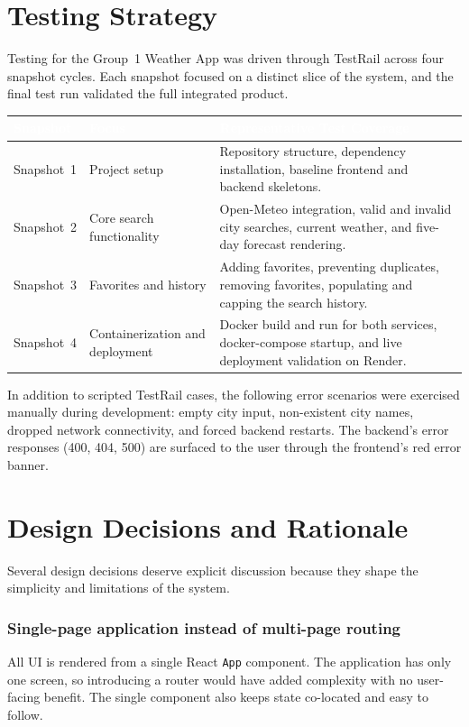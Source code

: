 \documentclass[11pt,letterpaper]{article}
\newcommand{\thead}[1]{\textcolor{white}{\bfseries #1}}
\begin{document}
\section{Testing Strategy}
Testing for the Group~1 Weather App was driven through TestRail across four snapshot cycles. Each snapshot focused on a distinct slice of the system, and the final test run validated the full integrated product.

\begin{tabularx}{\linewidth}{| L{1in} | L{1.7in} | Y |}
\hline
{}\thead{Snapshot} & \thead{Focus} & \thead{Representative Test Coverage} \\
\hline
Snapshot~1 & Project setup                  & Repository structure, dependency installation, baseline frontend and backend skeletons. \\ \hline
{}Snapshot~2 & Core search functionality       & Open-Meteo integration, valid and invalid city searches, current weather, and five-day forecast rendering. \\ \hline
Snapshot~3 & Favorites and history          & Adding favorites, preventing duplicates, removing favorites, populating and capping the search history. \\ \hline
{}Snapshot~4 & Containerization and deployment & Docker build and run for both services, docker-compose startup, and live deployment validation on Render. \\ \hline
\end{tabularx}

In addition to scripted TestRail cases, the following error scenarios were exercised manually during development: empty city input, non-existent city names, dropped network connectivity, and forced backend restarts. The backend's error responses (400, 404, 500) are surfaced to the user through the frontend's red error banner.

\section{Design Decisions and Rationale}\label{sec:decisions}
Several design decisions deserve explicit discussion because they shape the simplicity and limitations of the system.

\subsubsection*{Single-page application instead of multi-page routing}
All UI is rendered from a single React \texttt{App} component. The application has only one screen, so introducing a router would have added complexity with no user-facing benefit. The single component also keeps state co-located and easy to follow.
\end{document}
